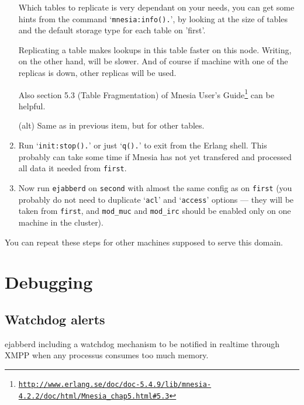 \documentclass[a4paper,10pt]{article}
\newcommand{\ind}[1]{\begin{latexonly}\index{#1}\end{latexonly}}
\newcommand{\term}[1]{\texttt{#1}}
\newcommand{\ejabberd}{\texttt{ejabberd}}
\gdef\footahref#1#2{#2\footnote{\href{#1}{\texttt{#1}}}}
\begin{document}
\begin{enumerate}
  Which tables to replicate is very dependant on your needs, you can get
  some hints from the command `\verb|mnesia:info().|', by looking at the
  size of tables and the default storage type for each table on 'first'.

  Replicating a table makes lookups in this table faster on this node.
  Writing, on the other hand, will be slower. And of course if machine with one
  of the replicas is down, other replicas will be used.

  Also \footahref{http://www.erlang.se/doc/doc-5.4.9/lib/mnesia-4.2.2/doc/html/Mnesia\_chap5.html\#5.3}
  {section 5.3 (Table Fragmentation) of Mnesia User's Guide} can be helpful.

  (alt) Same as in previous item, but for other tables.


\item Run `\verb|init:stop().|' or just `\verb|q().|' to exit from
  the Erlang shell. This probably can take some time if Mnesia has not yet
  transfered and processed all data it needed from \term{first}.


\item Now run \ejabberd{} on \term{second} with almost the same config as
  on \term{first} (you probably do not need to duplicate `\verb|acl|'
  and `\verb|access|' options --- they will be taken from
  \term{first}, and \verb|mod_muc| and \verb|mod_irc| should be
  enabled only on one machine in the cluster).
\end{enumerate}

You can repeat these steps for other machines supposed to serve this
domain.


\section{Debugging}
\label{debugging}
\ind{debugging}

\subsection{Watchdog alerts}
\label{watchdog}
\ind{debugging!watchdog}

ejabberd including a watchdog mechanism to be notified in realtime
through XMPP when any processus consumes too much memory.
\end{document}
